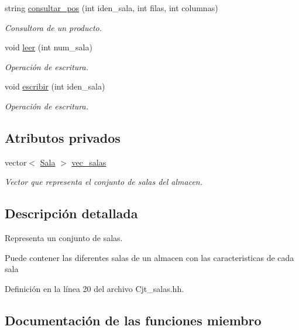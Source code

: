 \begin{DoxyCompactItemize}
string \hyperlink{class_cjt__salas_a7e06b122fbbee58f24b8938bc2975b16}{consultar\+\_\+pos} (int iden\+\_\+sala, int filas, int columnas)
\begin{DoxyCompactList}\small\item\em Consultora de un producto. \end{DoxyCompactList}\item 
void \hyperlink{class_cjt__salas_ae79acb3461bd487e7bda3af42a3f96b7}{leer} (int num\+\_\+sala)
\begin{DoxyCompactList}\small\item\em Operación de escritura. \end{DoxyCompactList}\item 
void \hyperlink{class_cjt__salas_a184f3ef5d7857c7f76ecef58b093f252}{escribir} (int iden\+\_\+sala)
\begin{DoxyCompactList}\small\item\em Operación de escritura. \end{DoxyCompactList}\end{DoxyCompactItemize}
\subsection*{Atributos privados}
\begin{DoxyCompactItemize}
\item 
vector$<$ \hyperlink{class_sala}{Sala} $>$ \hyperlink{class_cjt__salas_a3f130cc8bab35f449de8be69283af09e}{vec\+\_\+salas}
\begin{DoxyCompactList}\small\item\em Vector que representa el conjunto de salas del almacen. \end{DoxyCompactList}\end{DoxyCompactItemize}


\subsection{Descripción detallada}
Representa un conjunto de salas. 

Puede contener las diferentes salas de un almacen con las caracteristicas de cada sala 

Definición en la línea 20 del archivo Cjt\+\_\+salas.\+hh.



\subsection{Documentación de las funciones miembro}
\mbox{\label{class_cjt__salas_ab9f5c933dbf2fa1c0bedf0ff5ae6eeb8}} 
